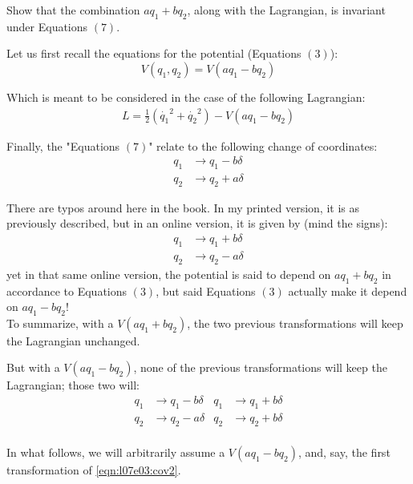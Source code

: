 \documentclass[solutions.tex]{subfiles}
\begin{document}
\maketitle
\begin{exercise}
Show that the combination $a q_1 + b q_2$, along with the Lagrangian,
is invariant under Equations $(7)$.
\end{exercise}
Let us first recall the equations for the potential (Equations $(3)$):
\[
	V(q_1, q_2) = V(a q_1 - b q_2)
\]

Which is meant to be considered in the case of the following
Lagrangian:
\begin{align}
	L = \frac{1}{2}(\dot{q_1}^2+\dot{q_2}^2) - V(a q_1-b q_2)
	\label{eqn:l07e03:lagrangian}
\end{align}

Finally, the "Equations $(7)$" relate to the following change of
coordinates:
\begin{align}
	q_1 &\rightarrow q_1 - b\delta \nonumber\\
	q_2 &\rightarrow q_2 + a\delta
	\label{eqn:l07e03:cov}
\end{align}

\begin{remark} There are typos around here in the book. In my printed
version, it is as previously described, but in an online version, it is given
by (mind the signs):
\begin{align*}
	q_1 &\rightarrow q_1 + b\delta \nonumber\\
	q_2 &\rightarrow q_2 - a\delta
\end{align*}
yet in that same online version, the potential is said to depend on $a q_1 + b q_2$
in accordance to Equations $(3)$, but said Equations $(3)$ actually make
it depend on $a q_1 - b q_2$! \\

To summarize, with a $V(a q_1 + b q_2)$, the two previous transformations
will keep the Lagrangian unchanged.

But with a $V(a q_1 - b q_2)$, none of the previous transformations will keep
the Lagrangian; those two will:
\begin{align}
	q_1 &\rightarrow q_1 - b\delta
	& q_1 &\rightarrow q_1 + b\delta \nonumber\\
	q_2 &\rightarrow q_2 - a\delta
	& q_2 &\rightarrow q_2 + b\delta \nonumber\\
	\label{eqn:l07e03:cov2}
\end{align}

In what follows, we will arbitrarily assume a $V(a q_1 - b q_2)$, and,
say, the first transformation of \eqref{eqn:l07e03:cov2}.
\end{remark}
\end{document}
